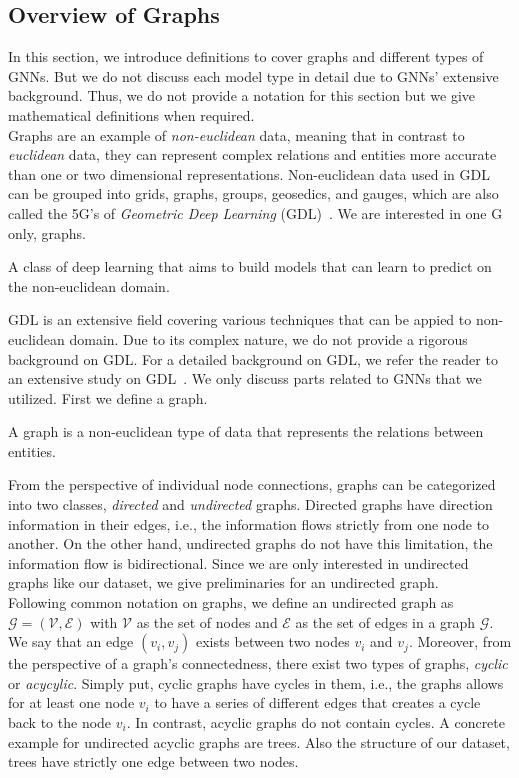 \subsection{Overview of Graphs}
\label{subsec:mixedApproaches_OverviewOfGraphs}
In this section, we introduce definitions to cover graphs and different types of GNNs. But we do not discuss each model type in detail due to GNNs' extensive background. Thus, we do not provide a notation for this section but we give mathematical definitions when required.\\
Graphs are an example of \emph{non-euclidean} data, meaning that in contrast to \emph{euclidean} data, they can represent complex relations and entities more accurate than one or two dimensional representations. Non-euclidean data used in GDL can be grouped into grids, graphs, groups, geosedics, and gauges, which are also called the 5G's of \emph{Geometric Deep Learning} (GDL)~\parencite{GeometricDeepLearning_Bronstein}. We are interested in one G only, graphs.
\begin{definition}
    A class of deep learning that aims to build models that can learn to predict on the non-euclidean domain.
\end{definition}
GDL is an extensive field covering various techniques that can be appied to non-euclidean domain. Due to its complex nature, we do not provide a rigorous background on GDL. For a detailed background on GDL, we refer the reader to an extensive study on GDL~\parencite{GeometricDeepLearning_Bronstein}. We only discuss parts related to GNNs that we utilized. First we define a graph.
\begin{definition}
    A graph is a non-euclidean type of data that represents the relations between entities.
\end{definition}
From the perspective of individual node connections, graphs can be categorized into two classes, \emph{directed} and \emph{undirected} graphs. Directed graphs have direction information in their edges, i.e., the information flows strictly from one node to another. On the other hand, undirected graphs do not have this limitation, the information flow is bidirectional. Since we are only interested in undirected graphs like our dataset, we give preliminaries for an undirected graph.\\
Following common notation on graphs, we define an undirected graph as $\mathcal{G} = (\mathcal{V}, \mathcal{E})$ with $\mathcal{V}$ as the set of nodes and $\mathcal{E}$ as the set of edges in a graph $\mathcal{G}$. We say that an edge $(v_i, v_j)$ exists between two nodes $v_i$ and $v_j$. Moreover, from the perspective of a graph's connectedness, there exist two types of graphs, \emph{cyclic} or \emph{acycylic}. Simply put, cyclic graphs have cycles in them, i.e., the graphs allows for at least one node $v_i$ to have a series of different edges that creates a cycle back to the node $v_i$. In contrast, acyclic graphs do not contain cycles. A concrete example for undirected acyclic graphs are trees. Also the structure of our dataset, trees have strictly one edge between two nodes.\\
